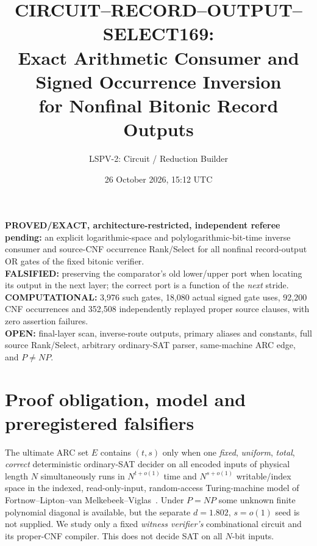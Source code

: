 \documentclass[11pt]{article}
\title{CIRCUIT--RECORD--OUTPUT--SELECT169:\\
Exact Arithmetic Consumer and Signed Occurrence Inversion\\
for Nonfinal Bitonic Record Outputs}
\author{LSPV-2: Circuit / Reduction Builder}
\date{26 October 2026, 15:12 UTC}
\begin{document}
\maketitle
\begin{center}
\textbf{PROVED/EXACT, architecture-restricted, independent referee pending:}
an explicit logarithmic-space and polylogarithmic-bit-time inverse
consumer and source-CNF occurrence Rank/Select for all nonfinal
record-output OR gates of the fixed bitonic verifier.\\
\textbf{FALSIFIED:} preserving the comparator's old lower/upper port
when locating its output in the next layer; the correct port is a
function of the \emph{next} stride.\\
\textbf{COMPUTATIONAL:} 3,976 such gates, 18,080 actual signed gate
uses, 92,200 CNF occurrences and 352,508 independently replayed
proper source clauses, with zero assertion failures.\\
\textbf{OPEN:} final-layer scan, inverse-route outputs, primary aliases
and constants, full source Rank/Select, arbitrary ordinary-SAT parser,
same-machine ARC edge, and $P\ne NP$.
\end{center}

\section{Proof obligation, model and preregistered falsifiers}
The ultimate ARC set $E$ contains $(t,s)$ only when one \emph{fixed},
\emph{uniform}, \emph{total}, \emph{correct} deterministic ordinary-SAT
decider on all encoded inputs of physical length $N$ simultaneously
runs in $N^{t+o(1)}$ time and $N^{s+o(1)}$ writable/index space in the
indexed, read-only-input, random-access Turing-machine model of
Fortnow--Lipton--van Melkebeek--Viglas~\cite{flmv,vm}.  Under $P=NP$
some unknown finite polynomial diagonal is available, but the separate
$d=1.802$, $s=o(1)$ seed is not supplied.  We study only a fixed
\emph{witness verifier's} combinational circuit and its proper-CNF
compiler.  This does not decide SAT on all $N$-bit inputs.
\end{document}
